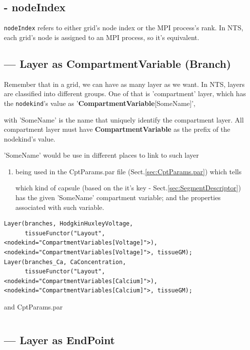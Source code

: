 \subsection{- nodeIndex}

\verb!nodeIndex! refers to either grid's node index or the MPI process's rank.
In NTS, each grid's node is assigned to an MPI process, so it's equivalent. 
\subsection{--- Layer as CompartmentVariable (Branch)}
\label{sec:Layer-as-Branch}

Remember that in a grid, we can have as many layer as we want. In NTS, layers
are classified into different groups. One of that is 'compartment' layer, which
has the \verb!nodekind!'s value as '{\bf CompartmentVariable}[SomeName]',


with 'SomeName' is the name that uniquely identify the compartment layer. All
compartment layer must have {\bf CompartmentVariable} as the prefix of the
nodekind's value.

'SomeName' would be use in different places to link to such layer
\begin{enumerate}
  \item being used in the CptParams.par file
(Sect.\ref{sec:CptParams.par}) which tells 

which kind of capsule (based on the it's key - Sect.\ref{sec:SegmentDescriptor})
has the given 'SomeName' compartment variable; and the properties associated
with such variable.
  
\end{enumerate}

{\tiny
\begin{verbatim}
Layer(branches, HodgkinHuxleyVoltage, 
      tissueFunctor("Layout", <nodekind="CompartmentVariables[Voltage]">), <nodekind="CompartmentVariables[Voltage]">, tissueGM);
Layer(branches_Ca, CaConcentration, 
      tissueFunctor("Layout", <nodekind="CompartmentVariables[Calcium]">), <nodekind="CompartmentVariables[Calcium]">, tissueGM);
\end{verbatim}
}
and CptParams.par
\begin{verbatim}

\end{verbatim}

\subsection{--- Layer as EndPoint}
\label{sec:Layer-as-EndPoint}

